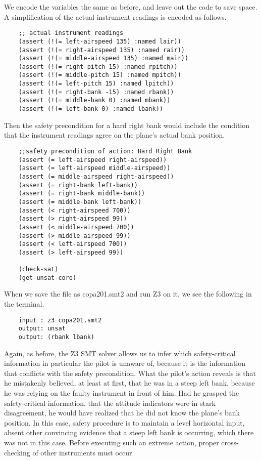 We encode the variables the same as before, and leave out the code to save space. A simplification of the actual instrument readings is encoded as follows.
\noindent
\begin{tcolorbox}
	\begin{lstlisting}
	;; actual instrument readings
	(assert (!(= left-airspeed 135) :named lair))
	(assert (!(= right-airspeed 135) :named rair))
	(assert (!(= middle-airspeed 135) :named mair))
	(assert (!(= right-pitch 15) :named rpitch))
	(assert (!(= middle-pitch 15) :named mpitch))
	(assert (!(= left-pitch 15) :named lpitch))
	(assert (!(= right-bank -15) :named rbank))
	(assert (!(= middle-bank 0) :named mbank))
	(assert (!(= left-bank 0) :named lbank))
	\end{lstlisting}	
\end{tcolorbox}	
\noindent
Then the safety precondition for a hard right bank would include the condition that the instrument readings agree on the plane's actual bank position.
\noindent
\begin{tcolorbox}
	\begin{lstlisting}
	;;safety precondition of action: Hard Right Bank
	(assert (= left-airspeed right-airspeed))
	(assert (= left-airspeed middle-airspeed))
	(assert (= middle-airspeed right-airspeed))
	(assert (= right-bank left-bank))
	(assert (= right-bank middle-bank))
	(assert (= middle-bank left-bank))
	(assert (< right-airspeed 700))
	(assert (> right-airspeed 99))
	(assert (< middle-airspeed 700))
	(assert (> middle-airspeed 99))
	(assert (< left-airspeed 700))
	(assert (> left-airspeed 99))
	
	(check-sat)
	(get-unsat-core)
	\end{lstlisting}	
\end{tcolorbox}	
\noindent
When we save the file as copa201.smt2 and run Z3 on it, we see the following in the terminal.
\noindent
\begin{tcolorbox}
	\begin{lstlisting}
	input : z3 copa201.smt2
	output: unsat
	output: (rbank lbank)
	\end{lstlisting}
\end{tcolorbox}
\noindent
Again, as before, the Z3 SMT solver allows us to infer which safety-critical information in particular the pilot is unaware of, because it is the information that conflicts with the safety precondition. What the pilot's action reveals is that he mistakenly believed, at least at first, that he was in a steep left bank, because he was relying on the faulty instrument in front of him. Had he grasped the safety-critical information, that the attitude indicators were in stark disagreement, he would have realized that he did not know the plane's bank position. In this case, safety procedure is to maintain a level horizontal input, absent other convincing evidence that a steep left bank is occurring, which there was not in this case. Before executing such an extreme action, proper cross-checking of other instruments must occur.  

